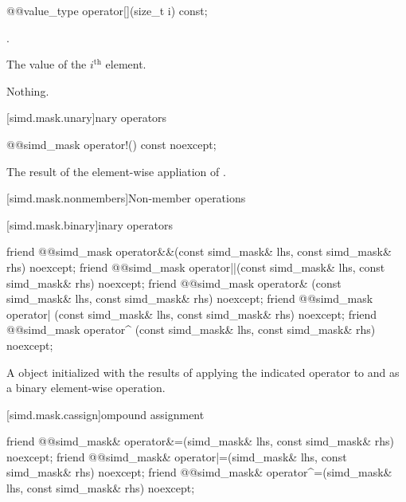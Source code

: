\begin{itemdecl}
@@value_type operator[](size_t i) const;
\end{itemdecl}

\begin{itemdescr}
  \pnum\requires
  .

  \pnum\returns
  The value of the $i^\text{th}$ element.

  \pnum\throws Nothing.
\end{itemdescr}

[simd.mask.unary]{\texorpdfstring{nary}{simd_mask unary} operators}

\begin{itemdecl}
@@simd_mask operator!() const noexcept;
\end{itemdecl}

\begin{itemdescr}
  \pnum\returns
  The result of the element-wise appliation of .
\end{itemdescr}

[simd.mask.nonmembers]{Non-member operations}

[simd.mask.binary]{\texorpdfstring{inary}{simd_mask binary} operators}

\begin{itemdecl}
friend @@simd_mask operator&&(const simd_mask& lhs, const simd_mask& rhs) noexcept;
friend @@simd_mask operator||(const simd_mask& lhs, const simd_mask& rhs) noexcept;
friend @@simd_mask operator& (const simd_mask& lhs, const simd_mask& rhs) noexcept;
friend @@simd_mask operator| (const simd_mask& lhs, const simd_mask& rhs) noexcept;
friend @@simd_mask operator^ (const simd_mask& lhs, const simd_mask& rhs) noexcept;
\end{itemdecl}

\begin{itemdescr}
  \pnum\returns
  A  object initialized with the results of applying the indicated operator to  and  as a binary element-wise operation.
\end{itemdescr}

[simd.mask.cassign]{\texorpdfstring{ompound}{simd_mask compound} assignment}

\begin{itemdecl}
friend @@simd_mask& operator&=(simd_mask& lhs, const simd_mask& rhs) noexcept;
friend @@simd_mask& operator|=(simd_mask& lhs, const simd_mask& rhs) noexcept;
friend @@simd_mask& operator^=(simd_mask& lhs, const simd_mask& rhs) noexcept;
\end{itemdecl}


